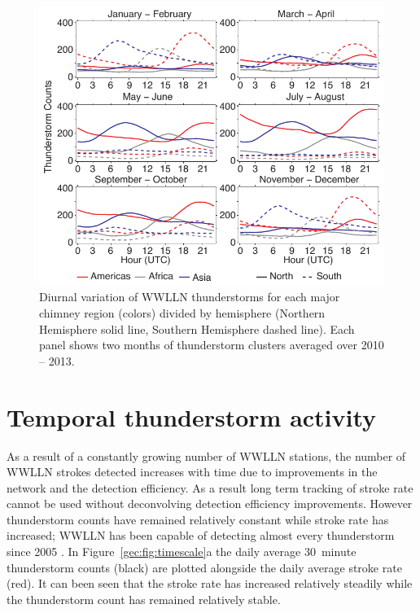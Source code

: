  \begin{figure}[ht!]
    \centering
    \includegraphics[scale=1]{GEC/Figures/bimonthly.pdf}
    \caption{Diurnal variation of WWLLN thunderstorms for each major chimney region (colors) divided by hemisphere (Northern Hemisphere solid line, Southern Hemisphere dashed line).
    		Each panel shows two months of thunderstorm clusters averaged over 2010 -- 2013.
		 }
    \label{gec:fig:bimonthly}
 \end{figure}

\section{Temporal thunderstorm activity}

As a result of a constantly growing number of WWLLN stations, the number of WWLLN strokes detected increases with time due to improvements in the network and the detection efficiency.
As a result long term tracking of stroke rate  cannot be used without deconvolving detection efficiency improvements.
However thunderstorm counts have remained relatively constant while stroke rate has increased; WWLLN has been capable of detecting almost every thunderstorm since 2005 \citep{Jacobson2006c}.
In Figure~\ref{gec:fig:timescale}a the daily average 30~minute thunderstorm counts (black) are plotted alongside the daily average stroke rate (red).
It can been seen that the stroke rate has increased relatively steadily while the thunderstorm count has remained relatively stable.


